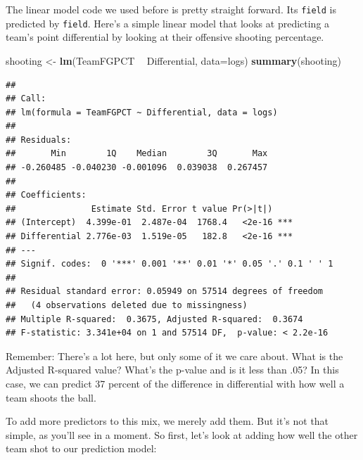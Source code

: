 \documentclass[
]{book}
\newenvironment{Shaded}{\begin{snugshade}}{\end{snugshade}}
\newcommand{\DataTypeTok}[1]{\textcolor[rgb]{0.13,0.29,0.53}{#1}}
\newcommand{\KeywordTok}[1]{\textcolor[rgb]{0.13,0.29,0.53}{\textbf{#1}}}
\newcommand{\NormalTok}[1]{#1}
\newcommand{\OperatorTok}[1]{\textcolor[rgb]{0.81,0.36,0.00}{\textbf{#1}}}
\newcommand{\StringTok}[1]{\textcolor[rgb]{0.31,0.60,0.02}{#1}}
\begin{document}
\begin{Shaded}
\end{Shaded}

The linear model code we used before is pretty straight forward. Its \texttt{field} is predicted by \texttt{field}. Here's a simple linear model that looks at predicting a team's point differential by looking at their offensive shooting percentage.

\begin{Shaded}
\begin{Highlighting}[]
\NormalTok{shooting <-}\StringTok{ }\KeywordTok{lm}\NormalTok{(TeamFGPCT }\OperatorTok{~}\StringTok{ }\NormalTok{Differential, }\DataTypeTok{data=}\NormalTok{logs)}
\KeywordTok{summary}\NormalTok{(shooting)}
\end{Highlighting}
\end{Shaded}

\begin{verbatim}
## 
## Call:
## lm(formula = TeamFGPCT ~ Differential, data = logs)
## 
## Residuals:
##       Min        1Q    Median        3Q       Max 
## -0.260485 -0.040230 -0.001096  0.039038  0.267457 
## 
## Coefficients:
##               Estimate Std. Error t value Pr(>|t|)    
## (Intercept)  4.399e-01  2.487e-04  1768.4   <2e-16 ***
## Differential 2.776e-03  1.519e-05   182.8   <2e-16 ***
## ---
## Signif. codes:  0 '***' 0.001 '**' 0.01 '*' 0.05 '.' 0.1 ' ' 1
## 
## Residual standard error: 0.05949 on 57514 degrees of freedom
##   (4 observations deleted due to missingness)
## Multiple R-squared:  0.3675,	Adjusted R-squared:  0.3674 
## F-statistic: 3.341e+04 on 1 and 57514 DF,  p-value: < 2.2e-16
\end{verbatim}

Remember: There's a lot here, but only some of it we care about. What is the Adjusted R-squared value? What's the p-value and is it less than .05? In this case, we can predict 37 percent of the difference in differential with how well a team shoots the ball.

To add more predictors to this mix, we merely add them. But it's not that simple, as you'll see in a moment. So first, let's look at adding how well the other team shot to our prediction model:
\end{document}

